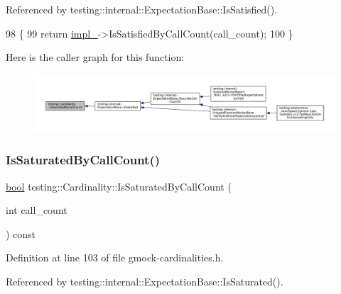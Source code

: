 Referenced by testing\+::internal\+::\+Expectation\+Base\+::\+Is\+Satisfied().


\begin{DoxyCode}
98                                                     \{
99     \textcolor{keywordflow}{return} \hyperlink{classtesting_1_1Cardinality_ae8c43c635af16756d535b491ccf19c2f}{impl\_}->IsSatisfiedByCallCount(call\_count);
100   \}
\end{DoxyCode}
Here is the caller graph for this function\+:
\nopagebreak
\begin{figure}[H]
\begin{center}
\leavevmode
\includegraphics[width=350pt]{classtesting_1_1Cardinality_a6c5e2bd2887ff06e20e6fcc4255a0c1c_icgraph}
\end{center}
\end{figure}
\mbox{\label{classtesting_1_1Cardinality_a57128ba46931e24a2b39af177e3346f8}} 
\subsubsection{\texorpdfstring{Is\+Saturated\+By\+Call\+Count()}{IsSaturatedByCallCount()}}
{\footnotesize\ttfamily \hyperlink{classbool}{bool} testing\+::\+Cardinality\+::\+Is\+Saturated\+By\+Call\+Count (\begin{DoxyParamCaption}\item[{int}]{call\+\_\+count }\end{DoxyParamCaption}) const\hspace{0.3cm}{\ttfamily [inline]}}



Definition at line 103 of file gmock-\/cardinalities.\+h.



Referenced by testing\+::internal\+::\+Expectation\+Base\+::\+Is\+Saturated().


